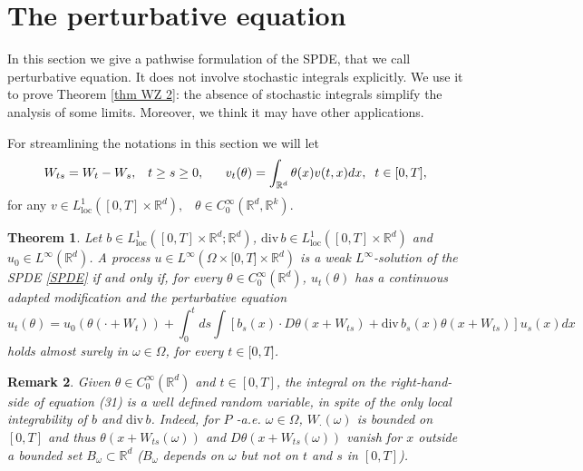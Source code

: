 \documentclass[a4paper,11pt]{article}
\newtheorem{theorem}{Theorem}
\newtheorem{remark}[theorem]{Remark}
\begin{document}

\section{The perturbative equation}

\label{sect perturbative}

In this section we give a pathwise formulation of the SPDE, that we call
perturbative equation. It does not involve stochastic integrals explicitly.
We use it to prove Theorem \ref{thm WZ 2}: the absence of stochastic
integrals simplify the analysis of some limits. Moreover, we think it may
have other applications.

For streamlining the notations in this section we will let
\begin{equation*}
W_{ts}=W_{t}-W_{s},\;\;\;t\geq s\geq 0,\;\;\;\;\;\;v_{t}(\theta )=\int_{%
\mathbb{R}^{d}}\theta (x)v(t,x)dx,\;\;t\in \lbrack 0,T],
\end{equation*}
for any $v\in L_{\mathrm{loc}}^{1}([0,T]\times \mathbb{R}^{d}),$ \ $\theta
\in C_{0}^{\infty }(\mathbb{R}^{d},\mathbb{R}^{k})$.

\begin{theorem}
\label{lemma:mild} Let $b\in L_{\mathrm{loc}}^{1}([0,T]\times \mathbb{R}^{d};%
\mathbb{R}^{d})$, $\mathrm{div}\,b\in L_{\mathrm{loc}}^{1}([0,T]\times
\mathbb{R}^{d})$ and $u_{0}\in L^{\infty }(\mathbb{R}^{d})$. A process $u\in
L^{\infty }(\Omega \times \lbrack 0,T]\times \mathbb{R}^{d})$ is a weak $%
L^{\infty }$-solution of the SPDE \eqref{SPDE} if and only if, for every $%
\theta \in C_{0}^{\infty }(\mathbb{R}^{d})$, $u_{t}(\theta )$ has a
continuous adapted modification and the perturbative equation
\begin{equation}
u_{t}(\theta )=u_{0}(\theta (\cdot +W_{t}))+\int_{0}^{t}ds\int
[b_{s}(x)\cdot D\theta (x+W_{ts})+\mathrm{div}\,b_{s}(x)\theta
(x+W_{ts})]u_{s}(x)dx  \label{ut}
\end{equation}
holds almost surely in $\omega \in \Omega $, for every $t\in \lbrack 0,T]$.
\end{theorem}

\begin{remark}
\label{remark sulla perturbativa}Given $\theta \in C_{0}^{\infty }\left(
\mathbb{R}^{d}\right) $ and $t\in \left[ 0,T\right] $, the integral on the
right-hand-side of equation (31) is a well defined random variable, in spite
of the only local integrability of $b$ and $\mathrm{div}\,b$. Indeed, for $P$%
-a.e. $\omega \in \Omega $, $W_{\cdot }\left( \omega \right) $ is bounded on
$\left[ 0,T\right] $ and thus $\theta \left( x+W_{ts}\left( \omega \right)
\right) $ and $D\theta \left( x+W_{ts}\left( \omega \right) \right) $ vanish
for $x$ outside a bounded set $B_{\omega }\subset \mathbb{R}^{d}$ ($%
B_{\omega }$ depends on $\omega $ but not on $t$ and $s$ in $\left[ 0,T%
\right] $).
\end{remark}
\end{document}
